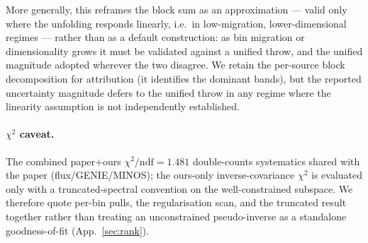 More generally, this reframes the block sum as an approximation --- valid only where the unfolding responds linearly, i.e.\ in low-migration, lower-dimensional regimes --- rather than as a default construction: as bin migration or dimensionality grows it must be validated against a unified throw, and the unified magnitude adopted wherever the two disagree. We retain the per-source block decomposition for attribution (it identifies the dominant bands), but the reported uncertainty magnitude defers to the unified throw in any regime where the linearity assumption is not independently established.

\paragraph{$\chi^{2}$ caveat.}
The combined paper$+$ours $\chi^{2}/\mathrm{ndf}=1.481$ double-counts systematics
shared with the paper (flux/GENIE/MINOS); the ours-only inverse-covariance
$\chi^{2}$ is evaluated only with a truncated-spectral convention on the
well-constrained subspace. We therefore quote per-bin pulls, the regularisation
scan, and the truncated result together rather than treating an unconstrained
pseudo-inverse as a standalone goodness-of-fit (App.~\ref{sec:rank}).
